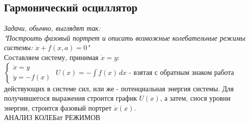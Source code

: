 \newcommand{\colontitulAutors}{astronom\_v\_cube, edombek et al.}
\newcommand{\colontitulYear}{2022}
\newcommand{\colontitulEducationalSubject}{Алгоритмы решения задач по теории колебаний}
\newcommand{\colontitulTeacher}{Сутягин А.А.}




	\small
	\begin{multicols*}{2}

		\section{Гармонический осциллятор}

		\textit{Задачи, обычно, выглядят так:\\
		"Построить фазовый портрет и описать возможные колебательные режимы системы: $ \ddot{x} + f(x, a) = 0 $"\\}
		Составляем систему, принимая $\dot{x} = y$:\\
		$\begin{cases}
			\dot{x} = y \\
			\dot{y} = -f(x)
		\end{cases} $
		$U(x) = -\int f(x) \,dx $ - взятая с обратным знаком работа действующих в системе сил, или же - потенциальная энергия системы. Для  получившегося выражения строится график $U(x)$, а затем, снося уровни энергии, строится фазовый портрет $\dot{x}(x)$.\\
		АНАЛИЗ КОЛЕБат РЕЖИМОВ


\end{multicols*}
